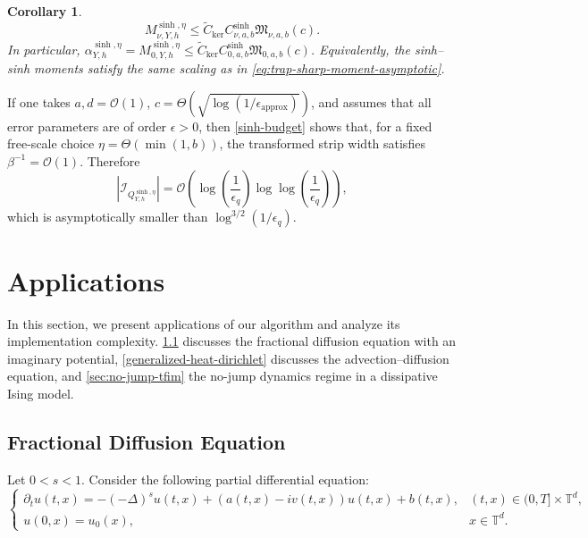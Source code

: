 \documentclass[10pt,reqno]{article}
\numberwithin{equation}{section}
\theoremstyle{plain}
\newtheorem{cor}[thm]{Corollary}
\theoremstyle{definition}
\begin{document}
\begin{cor}
\begin{equation}\label{eq:sinh-sharp-moment-bound}
M_{\nu,Y,h}^{\operatorname{sinh},\eta}\le \widetilde C_{\operatorname{ker}}C_{\nu,a,b}^{\operatorname{sinh}}\mathfrak M_{\nu,a,b}(c).
\end{equation}
In particular, \(\alpha_{Y,h}^{\operatorname{sinh},\eta}=M_{0,Y,h}^{\operatorname{sinh},\eta}\le \widetilde C_{\operatorname{ker}}C_{0,a,b}^{\operatorname{sinh}}\mathfrak M_{0,a,b}(c)\). Equivalently, the sinh--sinh moments satisfy the same scaling as in \cref{eq:trap-sharp-moment-asymptotic}. 
\end{cor}

If one takes $a,d=\mathcal O(1)$, $c=\Theta(\sqrt{\log(1/\epsilon_{\operatorname{approx}})})$, and assumes that all error parameters are of order $\epsilon>0$, then \cref{sinh-budget} shows that, for a fixed free-scale choice $\eta=\Theta(\min(1,b))$, the transformed strip width satisfies $\beta^{-1}=\mathcal O(1)$. Therefore
\begin{equation}
|\mathcal I_{Q_{Y,h}^{\operatorname{sinh},\eta}}|
=
\mathcal O\left(
\log\left(\frac1{\epsilon_q}\right)
\log\log\left(\frac1{\epsilon_q}\right)
\right),
\end{equation}
which is asymptotically smaller than $\log^{3/2}(1/\epsilon_q)$.
 


\section{Applications}\label{applications}
In this section, we present applications of our algorithm and analyze its implementation complexity. \cref{fractional-diff} discusses the fractional diffusion equation with an imaginary potential, \cref{generalized-heat-dirichlet} discusses the advection--diffusion equation, and \cref{sec:no-jump-tfim} the no-jump dynamics regime in a dissipative Ising model.

\subsection{Fractional Diffusion Equation}\label{fractional-diff} Let \(0<s<1\). Consider the following partial differential equation:
\begin{equation}\label{eq:fractional-diffusion-pde}
\begin{cases} \partial_t u(t,x) = -(-\Delta)^s u(t,x) + (a(t,x)-iv(t,x))u(t,x) + b(t,x), & (t,x)\in (0,T]\times\mathbb T^d,\\[0.5em] u(0,x)=u_0(x), & x\in\mathbb T^d. \end{cases}
\end{equation}
\end{document}
